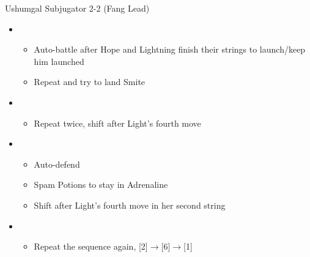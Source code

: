 \begin{multicols}{2}
\begin{battle}{Ushumgal Subjugator 2-2 (Fang Lead)}
\begin{itemize}
\begin{itemize}
            \end{itemize}
      \item \first
            \begin{itemize}
              \item Auto-battle after Hope and Lightning finish their strings to launch/keep him launched
              \item Repeat and try to land Smite
            \end{itemize}
      \item \third
            \begin{itemize}
              \item Repeat twice, shift after Light's fourth move
            \end{itemize}
      \item \fourth
            \begin{itemize}
              \item Auto-defend
              \item Spam Potions to stay in Adrenaline
              \item Shift after Light's fourth move in her second string
            \end{itemize}
      \item \second
            \begin{itemize}
              \item Repeat the sequence again, [2]$\rightarrow$[6]$\rightarrow$[1]
            \end{itemize}
    \end{itemize}
  \end{battle}
\end{multicols}
\newpage
